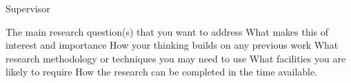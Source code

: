 


Supervisor

The main research question(s) that you want to address
What makes this of interest and importance
How your thinking builds on any previous work
What research methodology or techniques you may need to use
What facilities you are likely to require
How the research can be completed in the time available.
